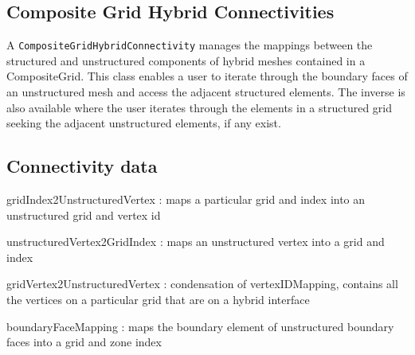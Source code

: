 \subsection{Composite Grid Hybrid Connectivities}
 
\newlength{\CompositeGridHybridConnectivityArgIndent}
 A {\tt CompositeGridHybridConnectivity} manages the mappings between the structured and 
 unstructured components of hybrid meshes contained in a CompositeGrid.  This class
 enables a user to iterate through the boundary faces of an unstructured mesh and access
 the adjacent structured elements.  The inverse is also available where
 the user iterates through the elements in a structured grid seeking the adjacent unstructured 
 elements, if any exist.
\subsection{Connectivity data}
 
 \itemize
  \item gridIndex2UnstructuredVertex : maps a particular grid and index 
 into an unstructured grid and vertex id
  \item unstructuredVertex2GridIndex : maps an unstructured vertex into a grid and index
  \item gridVertex2UnstructuredVertex : condensation of vertexIDMapping, contains all the vertices on a particular grid that are on
 a hybrid interface
  \item boundaryFaceMapping : maps the boundary element of unstructured boundary faces into a grid and zone index
